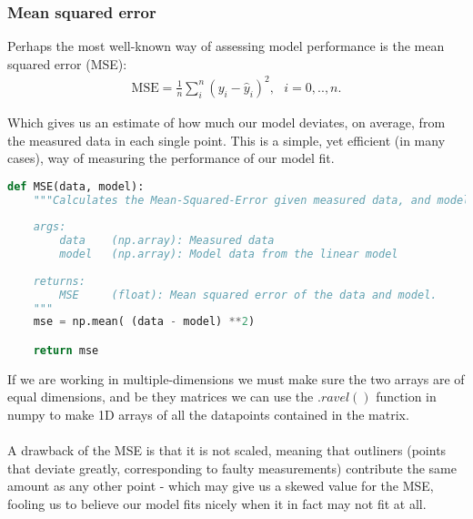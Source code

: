 \documentclass[../main.tex]{subfiles}
\begin{document}
\subsubsection{Mean squared error}\label{refmethod: MSE}
Perhaps the most well-known way of assessing model performance is the mean squared error (MSE):
\begin{align}
    \text{MSE} = \frac{1}{n}\sum_i^n(y_i - \hat y_i)^2, \,\,\,\,i=0,..,n.
\end{align}

Which gives us an estimate of how much our model deviates, on average, from the measured data in each single point. This is a simple, yet efficient (in many cases), way of measuring the performance of our model fit. 

\begin{lstlisting}[language=Python]
def MSE(data, model):
    """Calculates the Mean-Squared-Error given measured data, and model data.
    
    args:
        data    (np.array): Measured data
        model   (np.array): Model data from the linear model
    
    returns:
        MSE     (float): Mean squared error of the data and model.
    """
    mse = np.mean( (data - model) **2)

    return mse
\end{lstlisting}
\vskip0.1in
If we are working in multiple-dimensions we must make sure the two arrays are of equal dimensions, and be they matrices we can use the \ensuremath{.ravel()} function in numpy to make 1D arrays of all the datapoints contained in the matrix. \\ \\ A drawback of the MSE is that it is not scaled, meaning that outliners (points that deviate greatly, corresponding to faulty measurements) contribute the same amount as any other point - which may give us a skewed value for the MSE, fooling us to believe our model fits nicely when it in fact may not fit at all.
\end{document}
